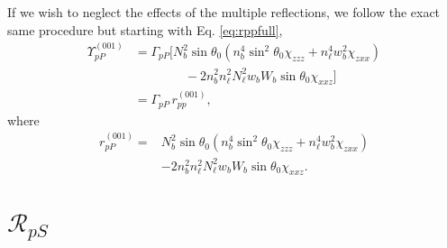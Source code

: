 If we wish to neglect the effects of the multiple reflections, we follow the
exact same procedure but starting with Eq. \eqref{eq:rppfull},
\begin{equation*}
\begin{split}
\Upsilon^{(001)}_{pP} &=
\Gamma_{pP}
\big[
N^{2}_{b}\sin\theta_{0}(n^{4}_{b}\sin^{2}\theta_{0}\chi_{zzz}
+ n^{4}_{\ell}w^{2}_{b}\chi_{zxx})\\
&\qquad\qquad- 2n^{2}_{b}n^{2}_{\ell}N^{2}_{\ell}w_{b}W_{b}\sin\theta_{0}
\chi_{xxz}
\big]\\
&= \Gamma_{pP}\,r^{(001)}_{pp},
\end{split}
\end{equation*}
where
\begin{equation}
\boxed{
\begin{split}
r^{(001)}_{pP} = 
&N^{2}_{b}\sin\theta_{0}(n^{4}_{b}\sin^{2}\theta_{0}\chi_{zzz}
+ n^{4}_{\ell}w^{2}_{b}\chi_{zxx})\\
&- 2n^{2}_{b}n^{2}_{\ell}N^{2}_{\ell}w_{b}W_{b}\sin\theta_{0}\chi_{xxz}.
\end{split}
}
\end{equation}




\section{\texorpdfstring{$\mathcal{R}_{pS}$}{RpS}}

